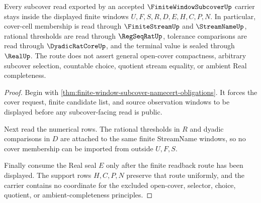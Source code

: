 \begin{theorem}
\label{thm:heine-borel-finite-window-subcover-route}
Every subcover read exported by an accepted $\FiniteWindowSubcoverUp$ carrier stays inside the displayed finite windows $U,F,S,R,D,E,H,C,P,N$. In particular, cover-cell membership is read through $\FiniteStreamUp$ and $\StreamNameUp$, rational thresholds are read through $\RegSeqRatUp$, tolerance comparisons are read through $\DyadicRatCoreUp$, and the terminal value is sealed through $\RealUp$. The route does not assert general open-cover compactness, arbitrary subcover selection, countable choice, quotient stream equality, or ambient Real completeness.
\end{theorem}
\begin{proof}
Begin with \autoref{thm:finite-window-subcover-namecert-obligations}. It forces the cover request, finite candidate list, and source observation windows to be displayed before any subcover-facing read is public.

Next read the numerical rows. The rational thresholds in $R$ and dyadic comparisons in $D$ are attached to the same finite StreamName windows, so no cover membership can be imported from outside $U,F,S$.

Finally consume the Real seal $E$ only after the finite readback route has been displayed. The support rows $H,C,P,N$ preserve that route uniformly, and the carrier contains no coordinate for the excluded open-cover, selector, choice, quotient, or ambient-completeness principles.
\end{proof}


\begin{closurestatus}{\FiniteWindowSubcoverUp}
  \theoryclosure{\seedClosure}
  \formalstatus{\unformalizedV}
\end{closurestatus}
